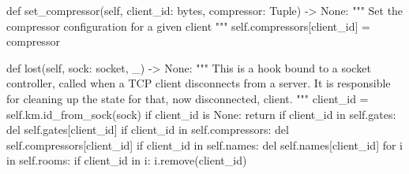 \begin{pythoncode}
    def set_compressor(self, client_id: bytes, compressor: Tuple) -> None:
        """
        Set the compressor configuration for a given client
        """
        self.compressors[client_id] = compressor

    def lost(self, sock: socket, _) -> None:
        """
        This is a hook bound to a socket controller, called when a TCP client
        disconnects from a server. It is responsible for cleaning up the state
        for that, now disconnected, client.
        """
        client_id = self.km.id_from_sock(sock)
        if client_id is None:
            return
        if client_id in self.gates:
            del self.gates[client_id]
        if client_id in self.compressors:
            del self.compressors[client_id]
        if client_id in self.names:
            del self.names[client_id]
        for i in self.rooms:
            if client_id in i:
                i.remove(client_id)
\end{pythoncode}
